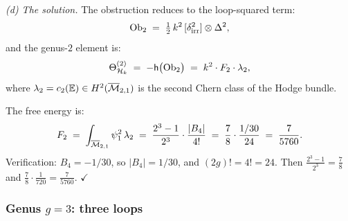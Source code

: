 \begin{computation}
\medskip\noindent\emph{(d) The solution.}
The obstruction reduces to the loop-squared term:
\begin{equation}\label{eq:thqg-VII-heis-obs2}
\mathrm{Ob}_2
\;=\;
\tfrac{1}{2}\,k^2\,[\delta_{\mathrm{irr}}^2] \otimes
\Delta^2,
\end{equation}
and the genus-$2$ element is:
\begin{equation}\label{eq:thqg-VII-heis-theta2}
\Theta^{(2)}_{\mathcal{H}_k}
\;=\;
-\mathsf{h}\bigl(\mathrm{Ob}_2\bigr)
\;=\;
k^2 \cdot F_2 \cdot \lambda_2,
\end{equation}
where $\lambda_2 = c_2(\mathbb{E}) \in H^2(\overline{\mathcal{M}}_{2,1})$
is the second Chern class of the Hodge bundle.

The free energy is:
\begin{equation}\label{eq:thqg-VII-heis-F2}
F_2
\;=\;
\int_{\overline{\mathcal{M}}_{2,1}} \psi_1^{2}\,\lambda_2
\;=\;
\frac{2^3 - 1}{2^3} \cdot \frac{|B_4|}{4!}
\;=\;
\frac{7}{8} \cdot \frac{1/30}{24}
\;=\;
\frac{7}{5760}.
\end{equation}
Verification: $B_4 = -1/30$, so $|B_4| = 1/30$, and
$(2g)! = 4! = 24$. Then
$\frac{2^3-1}{2^3} = \frac{7}{8}$ and
$\frac{7}{8} \cdot \frac{1}{720} = \frac{7}{5760}$. $\checkmark$
\end{computation}

\subsubsection{Genus $g = 3$: three loops}
\label{subsubsec:thqg-VII-heis-g3}

